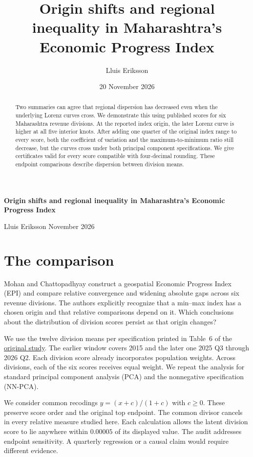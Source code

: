 \documentclass[10pt]{article}
\title{Origin shifts and regional inequality in Maharashtra's Economic Progress Index}
\author{Lluis Eriksson}\date{20 November 2026}
\begin{document}
\begin{center}{\LARGE\bfseries Origin shifts and regional inequality in Maharashtra's Economic Progress Index\par}\medskip Lluis Eriksson  November 2026\end{center}
\begin{abstract}
Two summaries can agree that regional dispersion has decreased even when the underlying Lorenz curves cross. We demonstrate this using published scores for six Maharashtra revenue divisions. At the reported index origin, the later Lorenz curve is higher at all five interior knots. After adding one quarter of the original index range to every score, both the coefficient of variation and the maximum-to-minimum ratio still decrease, but the curves cross under both principal component specifications. We give certificates valid for every score compatible with four-decimal rounding. These endpoint comparisons describe dispersion between division means.
\end{abstract}

\section{The comparison}
Mohan and Chattopadhyay construct a geospatial Economic Progress Index (EPI) and compare relative convergence and widening absolute gaps across six revenue divisions. The authors explicitly recognize that a min--max index has a chosen origin and that relative comparisons depend on it. Which conclusions about the distribution of division scores persist as that origin changes?

We use the twelve division means per specification printed in Table~6 of the \href{https://arxiv.org/html/2611.23798v1#S4.T6}{original study}. The earlier window covers 2015 and the later one 2025 Q3 through 2026 Q2. Each division score already incorporates population weights. Across divisions, each of the six scores receives equal weight. We repeat the analysis for standard principal component analysis (PCA) and the nonnegative specification (NN-PCA).

We consider common recodings $y=(x+c)/(1+c)$ with $c\ge0$. These preserve score order and the original top endpoint. The common divisor cancels in every relative measure studied here. Each calculation allows the latent division score to lie anywhere within $0.00005$ of its displayed value. The audit addresses endpoint sensitivity. A quarterly regression or a causal claim would require different evidence.
\end{document}
